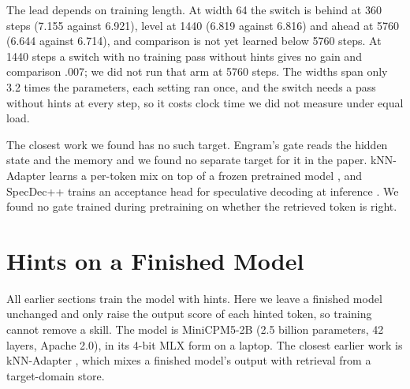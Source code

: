 \documentclass[11pt]{article}
\begin{document}
The lead depends on training length. At width 64 the switch is behind at 360 steps (7.155 against 6.921), level at 1440 (6.819 against 6.816) and ahead at 5760 (6.644 against 6.714), and comparison is not yet learned below 5760 steps. At 1440 steps a switch with no training pass without hints gives no gain and comparison .007; we did not run that arm at 5760 steps. The widths span only 3.2 times the parameters, each setting ran once, and the switch needs a pass without hints at every step, so it costs clock time we did not measure under equal load.

The closest work we found has no such target. Engram's gate reads the hidden state and the memory \cite{engram} and we found no separate target for it in the paper. kNN-Adapter learns a per-token mix on top of a frozen pretrained model \cite{knnadapter}, and SpecDec++ trains an acceptance head for speculative decoding at inference \cite{specdec}. We found no gate trained during pretraining on whether the retrieved token is right.

\begin{table}[h]\centering\small
{}
\caption{One model on web text and the made-up language, 5760 steps, one run each. Fact off is a common fact with hints off in the switch model.}\label{tab:switchweb}
\end{table}

\section{Hints on a Finished Model}\label{sec:finished}
All earlier sections train the model with hints. Here we leave a finished model unchanged and only raise the output score of each hinted token, so training cannot remove a skill. The model is MiniCPM5-2B (2.5 billion parameters, 42 layers, Apache 2.0), in its 4-bit MLX form on a laptop. The closest earlier work is kNN-Adapter \cite{knnadapter}, which mixes a finished model's output with retrieval from a target-domain store.
\end{document}
